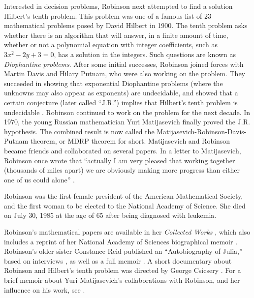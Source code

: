 \documentclass[../../../include/open-logic-section]{subfiles}
\begin{document}
Interested in decision problems, Robinson next attempted to find a
solution Hilbert's tenth problem. This problem was one of a famous
list of 23 mathematical problems posed by David Hilbert in 1900. The
tenth problem asks whether there is an algorithm that will answer, in
a finite amount of time, whether or not a polynomial equation with
integer coefficients, such as $3x^2 - 2y +3 = 0$, has a solution in
the integers. Such questions are known as \emph{Diophantine
  problems}. After some initial successes, Robinson joined forces with
Martin Davis and Hilary Putnam, who were also working on the
problem. They succeeded in showing that exponential Diophantine
problems (where the unknowns may also appear as exponents) are
undecidable, and showed that a certain conjecture (later called
``J.R.'')  implies that Hilbert's tenth problem is undecidable
\citep{DavisPutnamRobinson1961}.  Robinson continued to work on the
problem for the next decade.  In 1970, the young Russian mathematician
Yuri Matijasevich finally proved the J.R. hypothesis.  The combined
result is now called the Matijasevich-Robinson-Davis-Putnam theorem,
or MDRP theorem for short.  Matijasevich and Robinson became friends
and collaborated on several papers. In a letter to Matijasevich,
Robinson once wrote that ``actually I am very pleased that working
together (thousands of miles apart) we are obviously making more
progress than either one of us could alone''
\citep[45]{Matijasevich1992}.

Robinson was the first female president of the American Mathematical
Society, and the first woman to be elected to the National
Academy of Science. She died on July 30, 1985 at the age of 65 after
being diagnosed with leukemia.

\begin{reading}
Robinson's mathematical papers are available in her \textit{Collected
  Works} \citep{Robinson1996}, which also includes a reprint of her
National Academy of Sciences biographical memoir
\citep{Feferman1994}. Robinson's older sister Constance Reid published
an ``Autobiography of Julia,'' based on interviews \citep{Reid1986},
as well as a full memoir \citep{Reid1996}. A short documentary about
Robinson and Hilbert's tenth problem was directed by George Csicsery
\citep{Csicsery2016}. For a brief memoir about Yuri Matijasevich's
collaborations with Robinson, and her influence on his work, see
\citep{Matijasevich1992}.
\end{reading}
\end{document}
